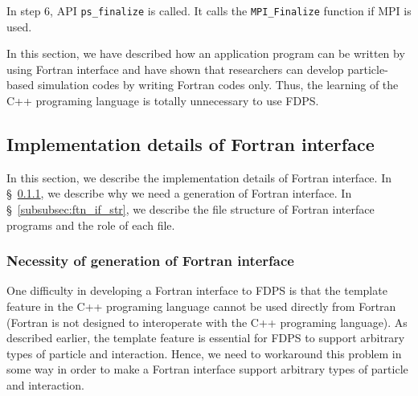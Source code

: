\documentclass[proof,useamsfonts]{pasj01}
\begin{document}
In step 6, API \texttt{ps\_finalize} is called. It calls the \texttt{MPI\_Finalize} function if MPI is used.

In this section, we have described how an application program can be written by using Fortran interface and have shown that researchers can develop particle-based simulation codes by writing Fortran codes only. Thus, the learning of the C++ programing language is totally unnecessary to use FDPS. 

\subsection{Implementation details of Fortran interface}
\label{subsec:ftn_if_impl}
In this section, we describe the implementation details of Fortran interface. In \S~\ref{subsubsec:ftn_if_gen}, we describe why we need a generation of Fortran interface. In \S~\ref{subsubsec:ftn_if_str}, we describe the file structure of Fortran interface programs and the role of each file.

\subsubsection{Necessity of generation of Fortran interface}
\label{subsubsec:ftn_if_gen}
One difficulty in developing a Fortran interface to FDPS is that the template feature in the C++ programing language cannot be used directly from Fortran (Fortran is not designed to interoperate with the C++ programing language). As described earlier, the template feature is essential for FDPS to support arbitrary types of particle and interaction. Hence, we need to workaround this problem in some way in order to make a Fortran interface support arbitrary types of particle and interaction.
\end{document}
